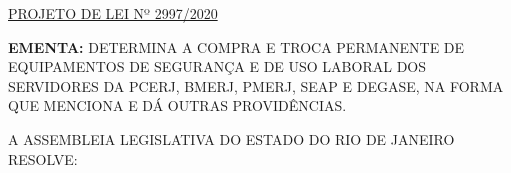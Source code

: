 \documentclass[10pt]{article}
\date{}
\begin{document}
\maketitle
\begin{center}
  \huge
  \vspace{-3cm}\href{http://alerjln1.alerj.rj.gov.br/scpro1923.nsf/f4b46b3cdbba990083256cc900746cf6/168af90f677f70fa032585c20064857d?OpenDocument}{PROJETO DE LEI Nº 2997/2020}
\bigskip
\bigskip
\bigskip
  
\end{center}

\textbf{EMENTA:} 
DETERMINA A COMPRA E TROCA PERMANENTE DE EQUIPAMENTOS DE SEGURANÇA E DE USO LABORAL DOS SERVIDORES DA PCERJ, BMERJ, PMERJ, SEAP E DEGASE, NA FORMA QUE MENCIONA E DÁ OUTRAS PROVIDÊNCIAS. 








\bigskip

\noindent
A ASSEMBLEIA LEGISLATIVA DO ESTADO DO RIO DE JANEIRO RESOLVE:
\end{document}
